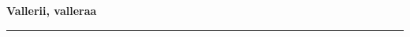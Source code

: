 \documentclass[10pt]{book}
\begin{document}
{
  \samepage
  \raggedbottom
  \raggedright
  \sloppy


  \vspace{0.2in}

  \noindent\begin{minipage}{.1\textwidth}
    \hfill\vspace{0.1in}
  \end{minipage}%
  \noindent\begin{minipage}{.8\textwidth}
    \centering
    \bfseries
    \large Vallerii, valleraa
  \end{minipage}%
  \noindent\begin{minipage}{.1\textwidth}
      \hfill\vspace{0.1in}
  \end{minipage}

  \nopagebreak[4]
  \vspace{0.1in}
  \nopagebreak[4]
  \hrule height 0.05ex
  \nopagebreak[4]
  \vspace{-0.05in}




}
\end{document}
